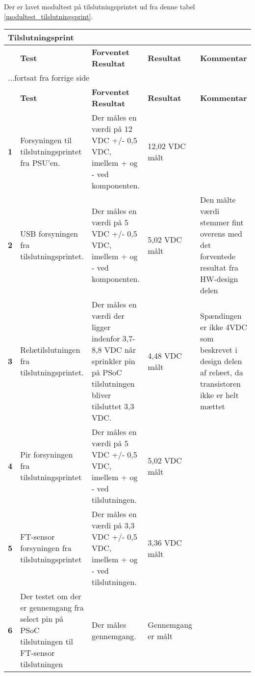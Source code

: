 Der er lavet modultest på tilslutningsprintet ud fra denne tabel \ref{modultest_tilslutningsprint}.

\begin{center}
\begin{longtable}{|p{}|p{}|p{}|p{}|p{}|} %
\hline
\multicolumn{5}{|l|}{\textbf{Tilslutningsprint}} \\ \hline
\multicolumn{1}{|c|}{} &
\textbf{Test} &
\textbf{Forventet \newline Resultat} &
\textbf{Resultat} &
\textbf{Kommentar} \\ \hline 
\endfirsthead

\multicolumn{5}{l}{...fortsat fra forrige side} \\ \hline 
\multicolumn{1}{|c|}{} &
\textbf{Test} &
\textbf{Forventet \newline Resultat} &
\textbf{Resultat} &
\textbf{Kommentar} \\ \hline 
\endhead

\textbf{1}	&Forsyningen til tilslutningsprintet fra PSU'en.
			&Der måles en værdi på 12 VDC +/- 0,5 VDC, imellem + og - ved komponenten.
			& 12,02 VDC målt
			&  \\ \hline 
			
\textbf{2}	&USB forsyningen fra tilslutningsprintet.
			&Der måles en værdi på 5 VDC +/- 0,5 VDC,  imellem + og - ved komponenten.
			& 5,02 VDC målt
			& Den målte værdi stemmer fint overens med det forventede resultat fra HW-design delen \\ \hline 
			
\textbf{3}	&Relætilslutningen fra tilslutningsprintet.
			&Der måles en værdi der ligger indenfor 3,7-8,8 VDC når sprinkler pin på PSoC tilslutningen bliver tilsluttet 3,3 VDC. 
			&4,48 VDC målt
			&Spændingen er ikke 4VDC som beskrevet i design delen af relæet, da transistoren ikke er helt mættet\\ \hline 
			
\textbf{4}	&Pir forsyningen fra tilslutningsprintet
			&Der måles en værdi på 5 VDC +/- 0,5 VDC, imellem + og - ved tilslutningen.
			&5,02 VDC målt
			& \\ \hline 
			
\textbf{5}	&FT-sensor forsyningen fra tilslutningsprintet
			&Der måles en værdi på 3,3 VDC +/- 0,5 VDC, imellem + og - ved tilslutningen.
			& 3,36 VDC målt
			& \\ \hline 						
			
\textbf{6}	&Der testet om der er gennemgang fra select pin på PSoC tilslutningen til FT-sensor tilslutningen
			&Der måles gennemgang.
			& Gennemgang er målt
			& \\ \hline 
			

\end{longtable}
\end{center}
